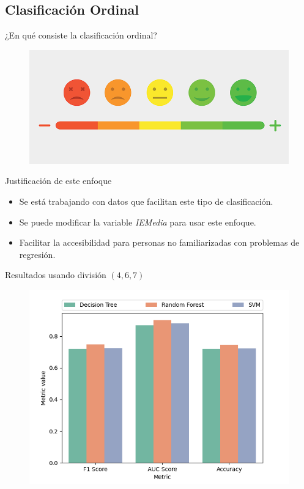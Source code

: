 \documentclass{beamer}
\begin{document}
	\subsection{Clasificación Ordinal}
		\begin{frame}{¿En qué consiste la clasificación ordinal?}
 			\begin{figure}
				\centering
				\includegraphics[scale=0.4]{likert}
			\end{figure}
		\end{frame}
		\begin{frame}{Justificación de este enfoque}
			\begin{itemize}
				\item Se está trabajando con datos que facilitan este tipo de clasificación.
				\item Se puede modificar la variable \textit{IEMedia} para usar este enfoque.
				\item Facilitar la accesibilidad para personas no familiarizadas con problemas de regresión.

			\end{itemize}
		\end{frame}
		\begin{frame}{Resultados usando división $(4, 6, 7)$}
			\begin{figure}
				\centering
				\includegraphics[scale=0.5]{ord_test_metrics}
			\end{figure}
		\end{frame}
\end{document}
